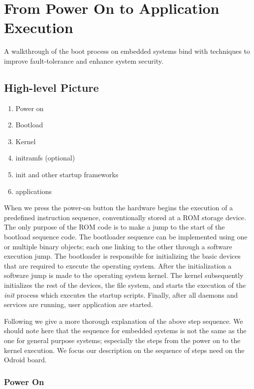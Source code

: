 
\section{From Power On to Application Execution}

A walkthrough of the boot process on embedded systems bind with techniques to improve fault-tolerance and enhance system security.


\subsection{High-level Picture}

\begin{enumerate}
 \item Power on
 \item Bootload
 \item Kernel
 \item initramfs (optional)
 \item init and other startup frameworks
 \item applications
\end{enumerate}

When we press the power-on button the hardware begins the execution of a predefined instruction sequence, conventionally stored at a ROM storage device. The only purpose of the ROM code is to make a jump to the start of the bootload sequence code. The bootloader sequence can be implemented using one or multiple binary objects; each one linking to the other through a software execution jump. The bootloader is responsible for initializing the basic devices that are required to execute the operating system. After the initialization a software jump is made to the operating system kernel. The kernel subsequently initializes the rest of the devices, the file system, and starts the execution of the \textit{init} process which executes the startup scripts. Finally, after all daemons and services are running, user application are started.

Following we give a more thorough explanation of the above step sequence. We should note here that the sequence for embedded systems is not the same as the one for general purpose systems; especially the steps from the power on to the kernel execution. We focus our description on the sequence of steps need on the Odroid board.

\subsubsection{Power On}


